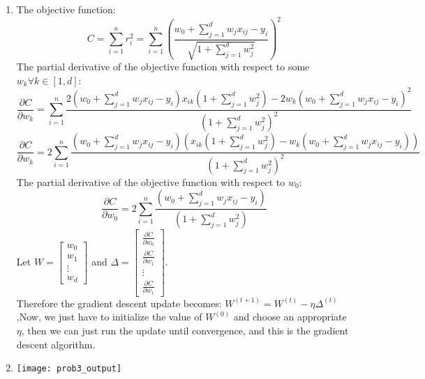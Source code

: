 \documentclass[twoside]{article}
\begin{document}
\begin{enumerate}
    \item
    The objective function:
    \begin{equation*}
        C = \sum_{i = 1}^n r_i^2 = \sum_{i = 1}^n \left( \frac{w_0 + \sum_{j = 1}^d w_j x_{ij} - y_i}{\sqrt{1 + \sum_{j=1}^d w_j^2}} \right)^2
    \end{equation*}
    The partial derivative of the objective function with respect to some $w_k \forall k \in [1,d]$:
    \begin{equation*}
        \frac{\partial C}{\partial w_k} =  \sum_{i = 1}^n \frac{2(w_0 + \sum_{j=1}^d w_j x_{ij} -y_i)x_{ik}(1 + \sum_{j=1}^d w_j^2) - 2w_k(w_0 + \sum_{j=1}^d w_j x_{ij} -y_i)^2}{(1 + \sum_{j=1}^d w_j^2)^2}
    \end{equation*}
    \begin{equation*}
    	\frac{\partial C}{\partial w_k} =  2\sum_{i = 1}^n \frac{(w_0 + \sum_{j=1}^d w_j x_{ij} -y_i)\left(x_{ik}(1 + \sum_{j=1}^d w_j^2) - w_k(w_0 + \sum_{j=1}^d w_j x_{ij} -y_i)\right)}{(1 + \sum_{j=1}^d w_j^2)^2}
    \end{equation*}
    The partial derivative of the objective function with respect to $w_0$:
    \begin{equation*}
    	\frac{\partial C}{\partial w_0} = 2\sum_{i = 1}^n \frac{(w_0 + \sum_{j=1}^d w_j x_{ij} -y_i)}{(1 + \sum_{j=1}^d w_j^2)}
    \end{equation*}
    Let $W = \begin{bmatrix} w_0\\w_1\\ \vdots\\ w_d \end{bmatrix}$ and $\Delta = \begin{bmatrix} \frac{\partial C}{\partial w_0}\\\frac{\partial C}{\partial w_1}\\ \vdots\\ \frac{\partial C}{\partial w_1} \end{bmatrix}$.\\
    Therefore the gradient descent update becomes: $W^{(t+1)} = W^{(t)} - \eta \Delta ^ {(t)}$.Now, we just have to initialize the value of $W^{(0)}$ and choose an appropriate $\eta$, then we can just run the update until convergence, and this is the gradient descent algorithm.
    
    \item
	\texttt{[image: prob3\_output]}
    
\end{enumerate}
\end{document}
